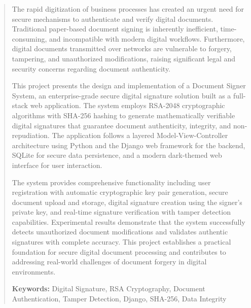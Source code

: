 \begin{abstract}
The rapid digitization of business processes has created an urgent need for secure mechanisms to authenticate and verify digital documents. Traditional paper-based document signing is inherently inefficient, time-consuming, and incompatible with modern digital workflows. Furthermore, digital documents transmitted over networks are vulnerable to forgery, tampering, and unauthorized modifications, raising significant legal and security concerns regarding document authenticity.

This project presents the design and implementation of a Document Signer System, an enterprise-grade secure digital signature solution built as a full-stack web application. The system employs RSA-2048 cryptographic algorithms with SHA-256 hashing to generate mathematically verifiable digital signatures that guarantee document authenticity, integrity, and non-repudiation. The application follows a layered Model-View-Controller architecture using Python and the Django web framework for the backend, SQLite for secure data persistence, and a modern dark-themed web interface for user interaction.

The system provides comprehensive functionality including user registration with automatic cryptographic key pair generation, secure document upload and storage, digital signature creation using the signer's private key, and real-time signature verification with tamper detection capabilities. Experimental results demonstrate that the system successfully detects unauthorized document modifications and validates authentic signatures with complete accuracy. This project establishes a practical foundation for secure digital document processing and contributes to addressing real-world challenges of document forgery in digital environments.

\vspace{0.5cm}
\noindent\textbf{Keywords:} Digital Signature, RSA Cryptography, Document Authentication, Tamper Detection, Django, SHA-256, Data Integrity
\end{abstract}

\clearpage
